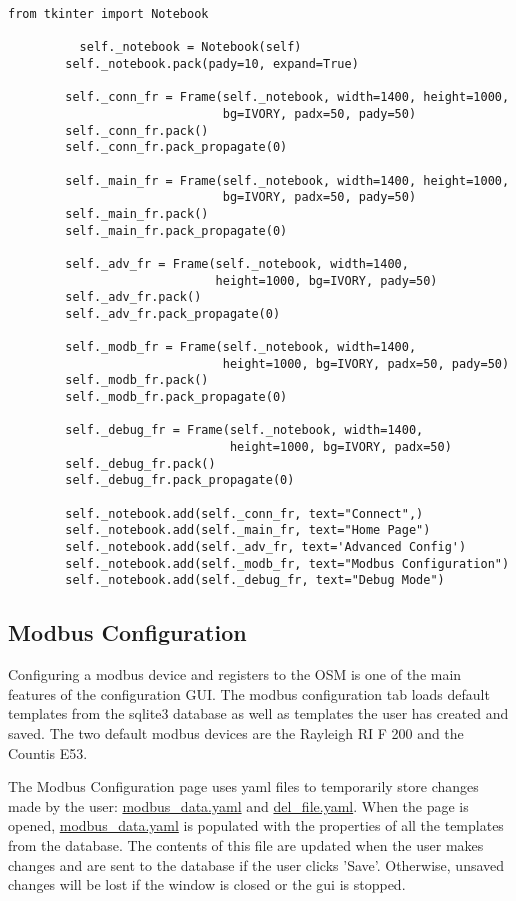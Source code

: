 \documentclass[a4paper,12pt, notitlepage]{article}
\begin{document}
\begin{lstlisting}[caption={Creating a window with several tabs.},label={lst: entrygui}]
from tkinter import Notebook

		  self._notebook = Notebook(self)
        self._notebook.pack(pady=10, expand=True)

        self._conn_fr = Frame(self._notebook, width=1400, height=1000,
                              bg=IVORY, padx=50, pady=50)
        self._conn_fr.pack()
        self._conn_fr.pack_propagate(0)

        self._main_fr = Frame(self._notebook, width=1400, height=1000,
                              bg=IVORY, padx=50, pady=50)
        self._main_fr.pack()
        self._main_fr.pack_propagate(0)

        self._adv_fr = Frame(self._notebook, width=1400,
                             height=1000, bg=IVORY, pady=50)
        self._adv_fr.pack()
        self._adv_fr.pack_propagate(0)

        self._modb_fr = Frame(self._notebook, width=1400,
                              height=1000, bg=IVORY, padx=50, pady=50)
        self._modb_fr.pack()
        self._modb_fr.pack_propagate(0)

        self._debug_fr = Frame(self._notebook, width=1400,
                               height=1000, bg=IVORY, padx=50)
        self._debug_fr.pack()
        self._debug_fr.pack_propagate(0)

        self._notebook.add(self._conn_fr, text="Connect",)
        self._notebook.add(self._main_fr, text="Home Page")
        self._notebook.add(self._adv_fr, text='Advanced Config')
        self._notebook.add(self._modb_fr, text="Modbus Configuration")
        self._notebook.add(self._debug_fr, text="Debug Mode")
\end{lstlisting}

\subsection{Modbus Configuration}
\label{ssec: modbusconfig}

Configuring a modbus device and registers to the OSM is one of the main features of the configuration GUI. The modbus configuration tab loads default templates from the sqlite3 database as well as templates the user has created and saved. The two default modbus devices are the Rayleigh RI F 200 and the Countis E53.

The Modbus Configuration page uses yaml files to temporarily store changes made by the user:  \url{modbus_data.yaml} and \url{del_file.yaml}. When the page is opened, \url{modbus_data.yaml} is populated with the properties of all the templates from the database. The contents of this file are updated when the user makes changes and are sent to the database if the user clicks 'Save'. Otherwise, unsaved changes will be lost if the window is closed or the gui is stopped.
\end{document}
